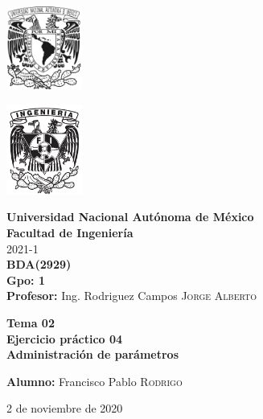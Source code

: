 \documentclass{article}
\newcommand{\materia}{BDA}
\newcommand{\clave}{2929}
\newcommand{\profesor}{Ing. Rodriguez Campos \textsc{Jorge Alberto}}
\newcommand{\semestre}{2021-1}
\newcommand{\alumno}{Francisco Pablo \textsc{Rodrigo}}
\newcommand{\actividad}{Tema 02 \\ Ejercicio práctico 04}
\newcommand{\titulo}{Administración de parámetros}
\newcommand{\fechaEntrega}{2 de noviembre de 2020}
\begin{document}
\thispagestyle{empty}
\begin{minipage}[t][5cm][t]{0.2\linewidth}
    \includegraphics[width=2.5cm]{unam.jpg}
    \vspace{10cm}

    \includegraphics[width=2.5cm]{fiblack}
\end{minipage}
\begin{minipage}[t]{0.7\linewidth}
    \vspace{-2.5cm}
    \LARGE{\textbf{Universidad Nacional Autónoma de México}}\\
    \Large{\textbf{Facultad de Ingeniería}} \\

    \large{\semestre}\\[2cm]

    \large{\textbf{\materia (\clave)}}\\
    \large{\textbf{Gpo: 1}}\\[5mm]
    \large{\textbf{Profesor:} \profesor}\\ [1.5cm]
    \begin{center}
        \LARGE{\textbf{\actividad}}\\
        \LARGE{\textbf{\titulo}}\\
    \end{center}

    \vspace{3.3cm}

    \large{\textbf{Alumno:} \alumno} \\[1.5cm]

    \begin{flushright}
        \fechaEntrega%
    \end{flushright}
\end{minipage}

\newpage
\end{document}
